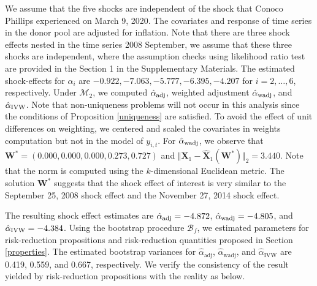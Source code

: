 \documentclass[11pt,3p,review,authoryear]{elsarticle}
\def\mbf#1{\mathbf{#1}} %
\def\mc#1{\mathcal{#1}} %
\theoremstyle{definition}
\begin{document}
We assume that the five shocks are independent of the shock that Conoco Phillips experienced on March 9, 2020. The covariates and response of time series in the donor pool are adjusted for inflation. Note that there are three shock effects nested in the time series 2008 September, we assume that these three shocks are independent, where the assumption checks using likelihood ratio test are provided in the Section 1 in the Supplementary Materials. The estimated shock-effects for $\alpha_i$ are $-0.922, -7.063, -5.777, -6.395, -4.207$ for $i = 2, \ldots, 6$, respectively. Under $\mc{M}_{2}$, we computed $\hat{\alpha}_{\rm adj}$, weighted adjustment $\hat{\alpha}_{\rm wadj}$, and $\hat{\alpha}_{\rm IVW}$. Note that non-uniqueness problems will not occur in this analysis since the conditions of Proposition \ref{uniqueness} are satisfied. To avoid the effect of  unit differences on weighting, we centered and scaled the covariates in weights computation but not in the model of $y_{i,t}$. For $\hat{\alpha}_{\rm wadj}$, we observe that 
$
  \mathbf{W}^*= (0.000,0.000, 0.000, 0.273, 0.727)
$
and 
$
  \Vert\mbf{X}_1-\hat{\mbf{X}}_1(\mbf{W}^*)\Vert_2 = 3.440.
$
Note that the norm is computed using the $k$-dimensional Euclidean metric. The solution $\mathbf{W}^*$ suggests that the shock effect of interest is very similar to the September 25, 2008 shock effect and  the November 27, 2014 shock effect. 


The resulting shock effect estimates are $\hat{\alpha}_{\rm adj}=-4.872$, $\hat{\alpha}_{\rm wadj}= -4.805$, and $\hat{\alpha}_{\rm IVW}=-4.384$. Using the bootstrap procedure $\mc{B}_f$, we estimated parameters for risk-reduction propositions and risk-reduction quantities proposed in  Section \ref{properties}. The estimated bootstrap variances for $\hat{\alpha}_{\text{adj}}$, $\hat{\alpha}_{\text{wadj}}$, and $\hat{\alpha}_{\text{IVW}}$  are 0.419, 0.559, and 0.667, respectively. 
We verify the consistency of the result yielded by risk-reduction propositions with the reality as below.
\end{document}

